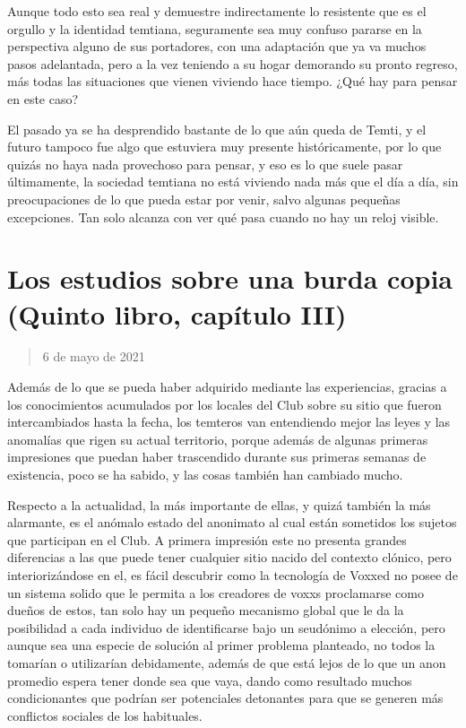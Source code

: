 \documentclass[
  spanish,
]{book}
\begin{document}
Aunque todo esto sea real y demuestre indirectamente lo resistente que es el orgullo y la identidad temtiana, seguramente sea muy confuso pararse en la perspectiva alguno de sus portadores, con una adaptación que ya va muchos pasos adelantada, pero a la vez teniendo a su hogar demorando su pronto regreso, más todas las situaciones que vienen viviendo hace tiempo. ¿Qué hay para pensar en este caso?

El pasado ya se ha desprendido bastante de lo que aún queda de Temti, y el futuro tampoco fue algo que estuviera muy presente históricamente, por lo que quizás no haya nada provechoso para pensar, y eso es lo que suele pasar últimamente, la sociedad temtiana no está viviendo nada más que el día a día, sin preocupaciones de lo que pueda estar por venir, salvo algunas pequeñas excepciones. Tan solo alcanza con ver qué pasa cuando no hay un reloj visible.

\hypertarget{los-estudios-sobre-una-burda-copia-quinto-libro-capuxedtulo-iii}{%
\section{Los estudios sobre una burda copia (Quinto libro, capítulo III)}\label{los-estudios-sobre-una-burda-copia-quinto-libro-capuxedtulo-iii}}

\begin{quote}
6 de mayo de 2021
\end{quote}

Además de lo que se pueda haber adquirido mediante las experiencias, gracias a los conocimientos acumulados por los locales del Club sobre su sitio que fueron intercambiados hasta la fecha, los temteros van entendiendo mejor las leyes y las anomalías que rigen su actual territorio, porque además de algunas primeras impresiones que puedan haber trascendido durante sus primeras semanas de existencia, poco se ha sabido, y las cosas también han cambiado mucho.

Respecto a la actualidad, la más importante de ellas, y quizá también la más alarmante, es el anómalo estado del anonimato al cual están sometidos los sujetos que participan en el Club. A primera impresión este no presenta grandes diferencias a las que puede tener cualquier sitio nacido del contexto clónico, pero interiorizándose en el, es fácil descubrir como la tecnología de Voxxed no posee de un sistema solido que le permita a los creadores de voxxs proclamarse como dueños de estos, tan solo hay un pequeño mecanismo global que le da la posibilidad a cada individuo de identificarse bajo un seudónimo a elección, pero aunque sea una especie de solución al primer problema planteado, no todos la tomarían o utilizarían debidamente, además de que está lejos de lo que un anon promedio espera tener donde sea que vaya, dando como resultado muchos condicionantes que podrían ser potenciales detonantes para que se generen más conflictos sociales de los habituales.
\end{document}
